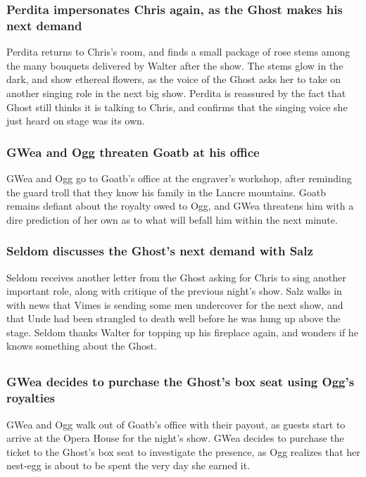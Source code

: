 \subsubsection{\Gls{Perdita} impersonates \Gls{Chris} again, as the \Gls{Ghost} makes his next
    demand}
\Gls{Perdita} returns to \Gls{Chris}'s room, and finds a small package of rose stems among the many
bouquets delivered by \Gls{Walter} after the show. The stems glow in the dark, and show ethereal
flowers, as the voice of the \Gls{Ghost} asks her to take on another singing role in the next big
show. \Gls{Perdita} is reassured by the fact that \Gls{Ghost} still thinks it is talking to
\Gls{Chris}, and confirms that the singing voice she just heard on stage was its own.

\subsubsection{\Gls{GWea} and \Gls{Ogg} threaten \Gls{Goatb} at his office}
\Gls{GWea} and \Gls{Ogg} go to \Gls{Goatb}'s office at the engraver's workshop, after reminding the
guard troll that they know his family in the Lancre mountains. \Gls{Goatb} remains defiant about
the royalty owed to \Gls{Ogg}, and \Gls{GWea} threatens him with a dire prediction of her own as to
what will befall him within the next minute.

\subsubsection{\Gls{Seldom} discusses the \Gls{Ghost}'s next demand with \Gls{Salz}}
\Gls{Seldom} receives another letter from the \Gls{Ghost} asking for \Gls{Chris} to sing another
important role, along with critique of the previous night's show. \Gls{Salz} walks in with news
that \Gls{Vimes} is sending some men undercover for the next show, and that \Gls{Unde} had been
strangled to death well before he was hung up above the stage. \Gls{Seldom} thanks \Gls{Walter} for
topping up his fireplace again, and wonders if he knows something about the \Gls{Ghost}.

\subsection{}
\subsubsection{\Gls{GWea} decides to purchase the \Gls{Ghost}'s box seat using \Gls{Ogg}'s
    royalties}
\Gls{GWea} and \Gls{Ogg} walk out of \Gls{Goatb}'s office with their payout, as guests start to
arrive at the Opera House for the night's show. \Gls{GWea} decides to purchase the ticket to the
\Gls{Ghost}'s box seat to investigate the presence, as \Gls{Ogg} realizes that her nest-egg is
about to be spent the very day she earned it.

